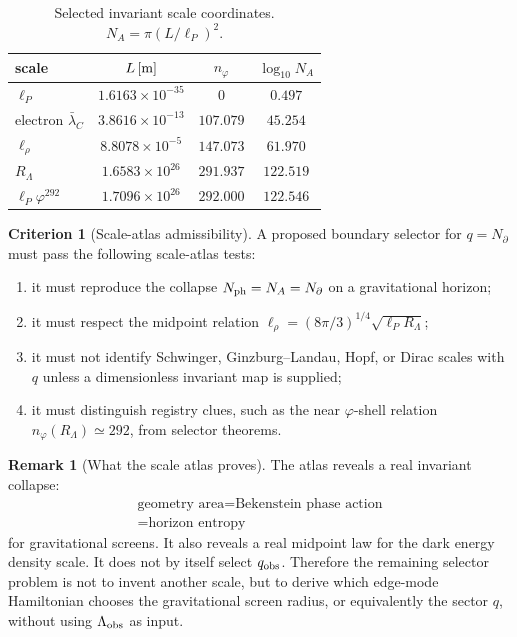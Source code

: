 \documentclass[aps,prd,reprint,nofootinbib,superscriptaddress,floatfix]{revtex4-2}
\numberwithin{equation}{section}
\theoremstyle{definition}
\newtheorem{criterion}{Criterion}[section]
\newtheorem{remark}{Remark}[section]
\theoremstyle{plain}
\begin{document}
\begin{table}[t]
\caption{Selected invariant scale coordinates.  \(N_A=\pi(L/\ell_P)^2\).}
\label{tab:scale-atlas}
\begin{ruledtabular}
\begin{tabular}{lccc}
scale & \(L\,[{\rm m}]\) & \(n_\varphi\) & \(\log_{10}N_A\)\\
\hline
\(\ell_P\) & \(1.6163\times10^{-35}\) & \(0\) & \(0.497\)\\
electron \(\bar\lambda_C\) & \(3.8616\times10^{-13}\) & \(107.079\) & \(45.254\)\\
\(\ell_\rho\) & \(8.8078\times10^{-5}\) & \(147.073\) & \(61.970\)\\
\(R_\Lambda\) & \(1.6583\times10^{26}\) & \(291.937\) & \(122.519\)\\
\(\ell_P\varphi^{292}\) & \(1.7096\times10^{26}\) & \(292.000\) & \(122.546\)
\end{tabular}
\end{ruledtabular}
\end{table}

\begin{criterion}[Scale-atlas admissibility]
A proposed boundary selector for \(q=N_\partial\) must pass the following
scale-atlas tests:
\begin{enumerate}
\item it must reproduce the collapse \(N_{\rm ph}=N_A=N_\partial\) on a
      gravitational horizon;
\item it must respect the midpoint relation
      \(\ell_\rho=(8\pi/3)^{1/4}\sqrt{\ell_P R_\Lambda}\);
\item it must not identify Schwinger, Ginzburg--Landau, Hopf, or Dirac
      scales with \(q\) unless a dimensionless invariant map is supplied;
\item it must distinguish registry clues, such as the near \(\varphi\)-shell
      relation \(n_\varphi(R_\Lambda)\simeq292\), from selector theorems.
\end{enumerate}
\end{criterion}

\begin{remark}[What the scale atlas proves]
The atlas reveals a real invariant collapse:
\[
\boxed{
\begin{gathered}
\text{geometry area}
=
\text{Bekenstein phase action}\\
=
\text{horizon entropy}
\end{gathered}}
\]
for gravitational screens.  It also reveals a real midpoint law for the dark
energy density scale.  It does not by itself select \(q_{\rm obs}\).  Therefore
the remaining selector problem is not to invent another scale, but to derive
which edge-mode Hamiltonian chooses the gravitational screen radius, or
equivalently the sector \(q\), without using \(\Lambda_{\rm obs}\) as input.
\end{remark}
\end{document}
